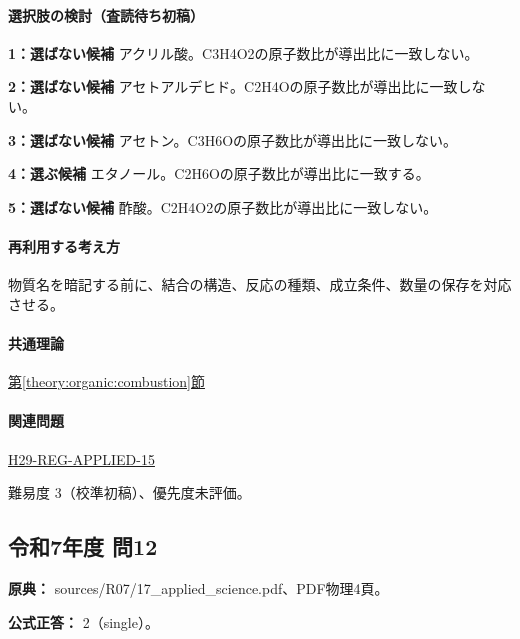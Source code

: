 \paragraph{選択肢の検討（査読待ち初稿）}\mbox{}\par

\noindent\textbf{1：選ばない候補} アクリル酸。C3H4O2の原子数比が導出比に一致しない。\par

\noindent\textbf{2：選ばない候補} アセトアルデヒド。C2H4Oの原子数比が導出比に一致しない。\par

\noindent\textbf{3：選ばない候補} アセトン。C3H6Oの原子数比が導出比に一致しない。\par

\noindent\textbf{4：選ぶ候補} エタノール。C2H6Oの原子数比が導出比に一致する。\par

\noindent\textbf{5：選ばない候補} 酢酸。C2H4O2の原子数比が導出比に一致しない。\par

\paragraph{再利用する考え方} 物質名を暗記する前に、結合の構造、反応の種類、成立条件、数量の保存を対応させる。

\paragraph{共通理論} \hyperref[theory:organic:combustion]{第\ref*{theory:organic:combustion}節}

\paragraph{関連問題} \hyperref[q:h29-reg-applied-15]{H29-REG-APPLIED-15}

\par 難易度 3（校準初稿）、優先度未評価。

\subsection{令和7年度 問12}
\label{q:r07-reg-applied-12}

\noindent\textbf{原典：} sources/R07/17\_applied\_science.pdf、PDF物理4頁。

\textbf{公式正答：} 2（single）。

